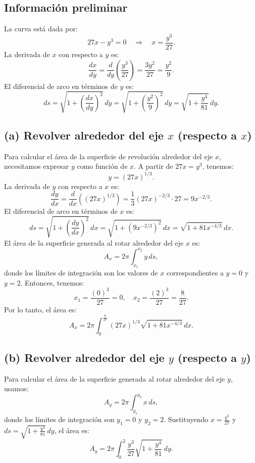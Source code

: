 \documentclass[11pt,letterpaper]{article}
\begin{document}
\subsection*{Información preliminar}

La curva está dada por:
\[
27x - y^3 = 0 \quad \Rightarrow \quad x = \frac{y^3}{27}.
\]
La derivada de \(x\) con respecto a \(y\) es:
\[
\frac{dx}{dy} = \frac{d}{dy}\left(\frac{y^3}{27}\right) = \frac{3y^2}{27} = \frac{y^2}{9}.
\]
El diferencial de arco en términos de \(y\) es:
\[
ds = \sqrt{1 + \left(\frac{dx}{dy}\right)^2} \, dy = \sqrt{1 + \left(\frac{y^2}{9}\right)^2} \, dy = \sqrt{1 + \frac{y^4}{81}} \, dy.
\]

\subsection*{(a) Revolver alrededor del eje \(x\) (respecto a \(x\))}

Para calcular el área de la superficie de revolución alrededor del eje \(x\), necesitamos expresar \(y\) como función de \(x\). A partir de \( 27x = y^3 \), tenemos:
\[
y = (27x)^{1/3}.
\]
La derivada de \(y\) con respecto a \(x\) es:
\[
\frac{dy}{dx} = \frac{d}{dx} ((27x)^{1/3}) = \frac{1}{3} (27x)^{-2/3} \cdot 27 = 9x^{-2/3}.
\]
El diferencial de arco en términos de \(x\) es:
\[
ds = \sqrt{1 + \left(\frac{dy}{dx}\right)^2} \, dx = \sqrt{1 + (9x^{-2/3})^2} \, dx = \sqrt{1 + 81x^{-4/3}} \, dx.
\]
El área de la superficie generada al rotar alrededor del eje \(x\) es:
\[
A_x = 2\pi \int_{x_1}^{x_2} y \, ds,
\]
donde los límites de integración son los valores de \(x\) correspondientes a \(y = 0\) y \(y = 2\). Entonces, tenemos:
\[
x_1 = \frac{(0)^3}{27} = 0, \quad x_2 = \frac{(2)^3}{27} = \frac{8}{27}.
\]
Por lo tanto, el área es:
\[
A_x = 2\pi \int_{0}^{\frac{8}{27}} (27x)^{1/3} \sqrt{1 + 81x^{-4/3}} \, dx.
\]

\subsection*{(b) Revolver alrededor del eje \(y\) (respecto a \(y\))}

Para calcular el área de la superficie generada al rotar alrededor del eje \(y\), usamos:
\[
A_y = 2\pi \int_{y_1}^{y_2} x \, ds,
\]
donde los límites de integración son \(y_1 = 0\) y \(y_2 = 2\). Sustituyendo \(x = \frac{y^3}{27}\) y \(ds = \sqrt{1 + \frac{y^4}{81}} \, dy\), el área es:
\[
A_y = 2\pi \int_{0}^{2} \frac{y^3}{27} \sqrt{1 + \frac{y^4}{81}} \, dy.
\]
\end{document}
